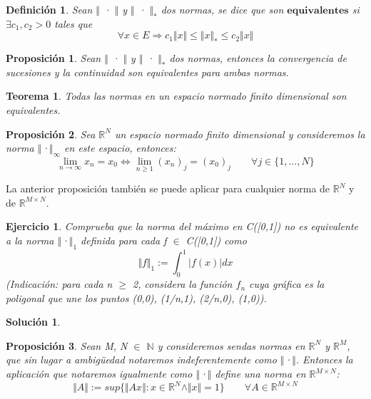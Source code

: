 \documentclass[10pt, a4paper]{article}
\theoremstyle{theorem-style}
\newtheorem{nth}{Teorema}[section]
\newtheorem{nprop}{Proposición}[section]
\theoremstyle{definition-style}
\newtheorem{ndef}{Definición}[section]
\theoremstyle{remark-style}
\theoremstyle{example-style}
\theoremstyle{definition-style}
\newtheorem{ejer}{Ejercicio}[section]
\theoremstyle{remark-style}
\newtheorem*{sol}{Solución}
\begin{document}
\begin{ndef}
Sean $\Vert$ · $\Vert$ y $\Vert$ · $\Vert _*$ dos normas, se dice que son $\textbf{equivalentes}$ si $\exists c_1, c_2 > 0$ tales que
\[ \forall x \in E \Rightarrow c_1\Vert x \Vert \leq \Vert x \Vert _* \leq c_2\Vert x \Vert \] 
\end{ndef}

\begin{nprop}
Sean $\Vert$ · $\Vert$ y $\Vert$ · $\Vert _*$ dos normas, entonces la convergencia de sucesiones y la continuidad son equivalentes para ambas normas. 
\end{nprop}

\begin{nth}
Todas las normas en un espacio normado finito dimensional son equivalentes.
\end{nth}

\begin{nprop}
Sea $\mathbb{R}^N$ un espacio normado finito dimensional y consideremos la norma $\Vert$·$\Vert _\infty$ en este espacio, entonces:
\[ \lim_{n \rightarrow \infty}x_n = x_0 \Leftrightarrow \lim_{n \geq 1}(x_n)_j = (x_0)_j \qquad \forall j\in \lbrace 1,...,N \rbrace \]
\end{nprop}

La anterior proposición también se puede aplicar para cualquier norma de $\mathbb{R}^N$ y de $\mathbb{R}^{M \times N}$.

\begin{ejer}
Comprueba que la norma del máximo en C([0,1]) no es equivalente a la norma $\Vert$·$\Vert _1$ definida para cada f $\in$ C([0,1]) como
\[ \Vert f \Vert _1 := \int_0^1 \vert f(x) \vert dx \]
(Indicación: para cada n $\geq$ 2, considera la función $f_n$ cuya gráfica es la poligonal que une los puntos (0,0), (1/n,1), (2/n,0), (1,0)).
\end{ejer}

\begin{sol}
\end{sol}

\begin{nprop}
Sean M, N $\in$ $\mathbb{N}$ y consideremos sendas normas en $\mathbb{R}^N$ y $\mathbb{R}^M$, que sin lugar a ambigüedad notaremos indeferentemente como $\Vert$·$\Vert$. Entonces la aplicación que notaremos igualmente como $\Vert$·$\Vert$ define una norma en $\mathbb{R}^{M \times N}$:
\[ \Vert A \Vert := sup \lbrace \Vert Ax \Vert : x \in \mathbb{R}^N \wedge \Vert x \Vert = 1 \rbrace \qquad \forall A \in \mathbb{R}^{M \times N} \]
\end{nprop}
\end{document}
